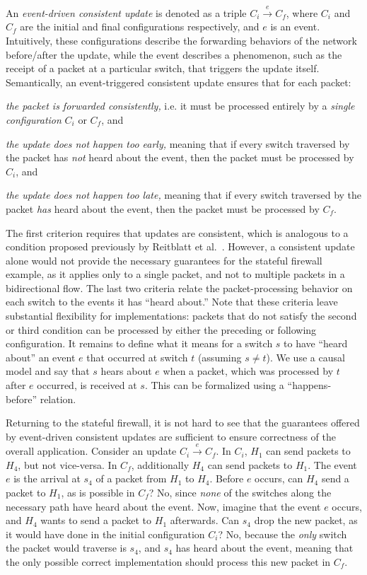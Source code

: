 \documentclass[pldi-cameraready]{sigplanconf}
\begin{document}
An {\em event-driven consistent update} is denoted as a triple 
$C_i \xrightarrow{e} C_f$,
where $C_i$ and $C_f$ are the initial and final configurations respectively,
and $e$ is an 
event. Intuitively, these configurations describe the forwarding
behaviors of the network before/after the update, while the event
describes a phenomenon, such as the receipt of a packet at a particular switch,
that triggers the update itself.
Semantically, an event-triggered consistent update ensures that for each packet:
\begin{compactenum}
\item {\em the packet is forwarded consistently,} i.e.
   it must be processed entirely by a {\em single configuration}
  $C_i$ or $C_f$, and
\item {\em the update does not happen too early,} meaning that if every switch traversed by the packet has {\em not} heard about the event, then the
  packet must be processed by $C_i$, and
\item {\em the update does not happen too late,} meaning that if every switch traversed by the packet {\em has} heard about the event, then the packet must
  be processed by $C_f$.
\end{compactenum}
The first criterion requires that updates are consistent, which is
analogous to a condition proposed previously by Reitblatt et
al.~\cite{reitblatt2012abstractions}. However, a consistent update
alone would not provide the  necessary guarantees for the stateful
firewall example, as it applies only to a single packet, and not to
multiple packets in a bidirectional flow. The last two criteria relate
the packet-processing behavior on each switch to the events it has
``heard about.'' Note that these criteria leave substantial
flexibility for implementations: packets that do not satisfy the
second or third condition can be processed by either the preceding or following
configuration. It remains to define what it means for a switch $s$ to
have ``heard about'' an event $e$ that occurred at switch $t$
(assuming $s \neq t$). We use
a causal model and say that $s$ hears about $e$ when a packet, which
was processed by $t$ after $e$ occurred, is received at $s$. This
can be formalized using a ``happens-before''
relation. 

Returning to the stateful firewall, it is not hard to see that the
guarantees offered by event-driven consistent updates are
sufficient to ensure correctness of the overall
application. Consider an update $C_i \xrightarrow{e} C_f$. 
In $C_i$, $H_1$ can send packets to $H_4$, but not vice-versa. In
$C_f$, additionally $H_4$ can send packets to $H_1$. The event $e$ is
the arrival at $s_4$ of a packet from $H_1$ to $H_4$.
Before $e$ occurs, can $H_4$ send a packet to $H_1$, as is possible in $C_f$? No,
since {\em none} of the switches along the necessary path have
heard about the event.
Now, imagine that the
event $e$ occurs, and $H_4$ wants to send a packet to $H_1$
afterwards. Can $s_4$ drop the new packet, as it would have done in the
initial configuration $C_i$? No, because the {\em only} switch the packet would
traverse is $s_4$, and $s_4$ has heard about the event, meaning
that the only possible correct implementation should process this new packet in
$C_f$. 
\end{document}
